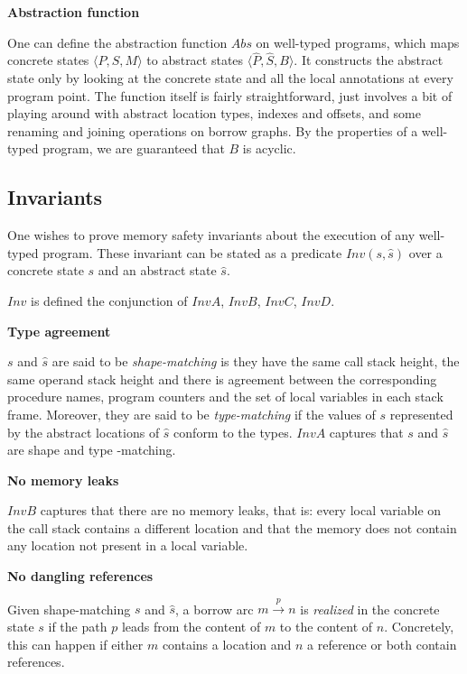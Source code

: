 \vspace{0.1cm}

\noindent\textbf{Abstraction function}

One can define the abstraction function $Abs$ on well-typed programs, which maps concrete states \(\langle P,S,M \rangle\) to abstract states $\langle \hat{P},\hat{S},B \rangle$. It constructs the abstract state only by looking at the concrete state and all the local annotations at every program point. The function itself is fairly straightforward, just involves a bit of playing around with abstract location types, indexes and offsets, and some renaming and joining operations on borrow graphs. By the properties of a well-typed program, we are guaranteed that $B$ is acyclic.

\subsection{Invariants}

One wishes to prove memory safety invariants about the execution of any well-typed program. These invariant can be stated as a predicate $Inv(s, \hat{s})$ over a concrete state $s$ and an abstract state $\hat{s}$.

$Inv$ is defined the conjunction of $InvA$, $InvB$, $InvC$, $InvD$.

\noindent\textbf{Type agreement}

$s$ and $\hat{s}$ are said to be \textit{shape-matching} is they have the same call stack height, the same operand stack height and there is agreement between the corresponding procedure names, program counters and the set of local variables in each stack frame. Moreover, they are said to be \textit{type-matching} if the values of $s$ represented by the abstract locations of $\hat{s}$ conform to the types.
$InvA$ captures that $s$ and $\hat{s}$ are shape and type -matching.

\noindent\textbf{No memory leaks}

$InvB$ captures that there are no memory leaks, that is: every local variable on the call stack contains a different location and that the memory does not contain any location not present in a local variable.

\noindent\textbf{No dangling references}

Given shape-matching $s$ and $\hat{s}$, a borrow arc $m \stackrel{p}{\rightarrow} n$ is \textit{realized} in the concrete state $s$ if the path $p$ leads from the content of $m$ to the content of $n$. Concretely, this can happen if either $m$ contains a location and $n$ a reference or both contain references.

